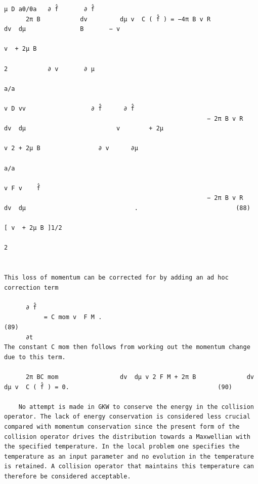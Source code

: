\documentclass[a4paper]{article}
\newcommand{\gkwpagefont}{\fontsize{6.0pt}{7.55pt}\selectfont}
\begin{document}
\begin{Verbatim}[fontsize=\gkwpagefont]
                                                                                       μ D aθ/θa   ∂ f̂       ∂ f̂
      2π B           dv         dμ v  C ( f̂ ) = −4π B v R               dv  dμ               B       − v
                                                                                     v  + 2μ B
                                                                                       2           ∂ v       ∂ μ
                                                                                              a/a                               
                                                                                        v D vv                  ∂ f̂      ∂ f̂
                                                        − 2π B v R          dv  dμ                         v        + 2μ
                                                                                      v 2 + 2μ B                ∂ v      ∂μ
                                                                                                a/a
                                                                                             v F v    f̂
                                                        − 2π B v R          dv  dμ                              .                           (88)
                                                                                       [ v  + 2μ B ]1/2
                                                                                         2


This loss of momentum can be corrected for by adding an ad hoc correction term

      ∂ f̂
           = C mom v  F M .                                                                                                                 (89)
      ∂t
The constant C mom then follows from working out the momentum change due to this term.
                                                                          
      2π BC mom                 dv  dμ v 2 F M + 2π B              dv        dμ v  C ( f̂ ) = 0.                                         (90)

    No attempt is made in GKW to conserve the energy in the collision operator. The lack of energy conservation is considered less crucial
compared with momentum conservation since the present form of the collision operator drives the distribution towards a Maxwellian with
the specified temperature. In the local problem one specifies the temperature as an input parameter and no evolution in the temperature
is retained. A collision operator that maintains this temperature can therefore be considered acceptable.


\end{Verbatim}
\end{document}
